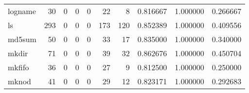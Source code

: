 \begin{tabular}{lrrrrrrrrr}
logname   &                                        30 &                                                  0 &                                                  0 &                                                  0 &                                                 22 &                                                  8 &                                           0.816667 &                               1.000000 &                             0.266667 \\
ls        &                                       293 &                                                  0 &                                                  0 &                                                  0 &                                                173 &                                                120 &                                           0.852389 &                               1.000000 &                             0.409556 \\
md5sum    &                                        50 &                                                  0 &                                                  0 &                                                  0 &                                                 33 &                                                 17 &                                           0.835000 &                               1.000000 &                             0.340000 \\
mkdir     &                                        71 &                                                  0 &                                                  0 &                                                  0 &                                                 39 &                                                 32 &                                           0.862676 &                               1.000000 &                             0.450704 \\
mkfifo    &                                        36 &                                                  0 &                                                  0 &                                                  0 &                                                 27 &                                                  9 &                                           0.812500 &                               1.000000 &                             0.250000 \\
mknod     &                                        41 &                                                  0 &                                                  0 &                                                  0 &                                                 29 &                                                 12 &                                           0.823171 &                               1.000000 &                             0.292683 \\

\end{tabular}
